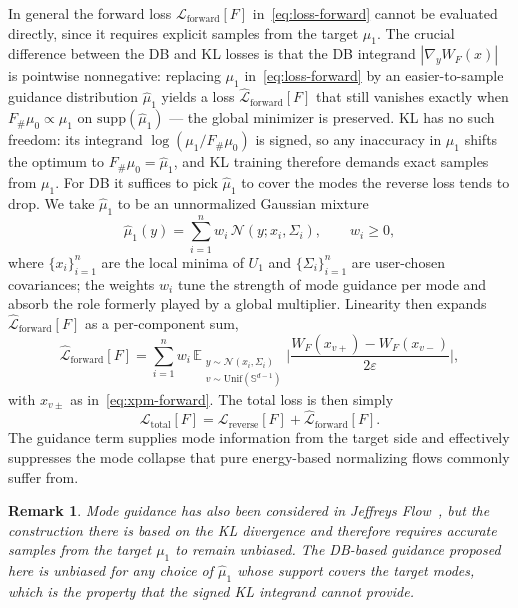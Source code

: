 \documentclass{article}
\newtheorem*{remark}{Remark}
\newcommand{\Ge}{\geqslant}
\theoremstyle{plain}
\begin{document}
In general the forward loss $\mathcal L_{\mathrm{forward}}[F]$ in~\eqref{eq:loss-forward} cannot be evaluated directly, since it requires explicit samples from the target $\mu_1$. The crucial difference between the DB and KL losses is that the DB integrand $|\nabla_y W_F(x)|$ is pointwise nonnegative: replacing $\mu_1$ in~\eqref{eq:loss-forward} by an easier-to-sample guidance distribution $\hat\mu_1$ yields a loss $\hat{\mathcal L}_{\mathrm{forward}}[F]$ that still vanishes exactly when $F_{\#}\mu_0 \propto \mu_1$ on $\mathrm{supp}(\hat\mu_1)$ — the global minimizer is preserved. KL has no such freedom: its integrand $\log(\mu_1/F_{\#}\mu_0)$ is signed, so any inaccuracy in $\mu_1$ shifts the optimum to $F_{\#}\mu_0 = \hat\mu_1$, and KL training therefore demands exact samples from $\mu_1$. For DB it suffices to pick $\hat\mu_1$ to cover the modes the reverse loss tends to drop. We take $\hat\mu_1$ to be an unnormalized Gaussian mixture
\begin{equation}\label{eq:hat-mu1}
    \hat\mu_1(y) = \sum_{i=1}^n w_i\, \mathcal N(y; x_i, \Sigma_i), \qquad w_i \Ge 0,
\end{equation}
where $\{x_i\}_{i=1}^n$ are the local minima of $U_1$ and $\{\Sigma_i\}_{i=1}^n$ are user-chosen covariances; the weights $w_i$ tune the strength of mode guidance per mode and absorb the role formerly played by a global multiplier. Linearity then expands $\hat{\mathcal L}_{\mathrm{forward}}[F]$ as a per-component sum,
\begin{equation}\label{eq:hat-loss-forward}
    \hat{\mathcal L}_{\mathrm{forward}}[F] = \sum_{i=1}^n w_i\, \mathbb E_{\substack{y \sim \mathcal N(x_i, \Sigma_i) \\ v \sim \mathrm{Unif}(\mathbb S^{d-1})}} \biggl|\frac{W_F(x_{v+}) - W_F(x_{v-})}{2\varepsilon}\biggr|,
\end{equation}
with $x_{v\pm}$ as in~\eqref{eq:xpm-forward}. The total loss is then simply
\begin{equation}\label{eq:total-loss}
    \mathcal L_{\mathrm{total}}[F] = \mathcal L_{\mathrm{reverse}}[F] + \hat{\mathcal L}_{\mathrm{forward}}[F].
\end{equation}
The guidance term supplies mode information from the target side and effectively suppresses the mode collapse that pure energy-based normalizing flows commonly suffer from.

\begin{remark}
    Mode guidance has also been considered in Jeffreys Flow~\citep{lin2026jeffreys}, but the construction there is based on the KL divergence and therefore requires accurate samples from the target $\mu_1$ to remain unbiased. The DB-based guidance proposed here is unbiased for any choice of $\hat\mu_1$ whose support covers the target modes, which is the property that the signed KL integrand cannot provide.
\end{remark}
\end{document}
